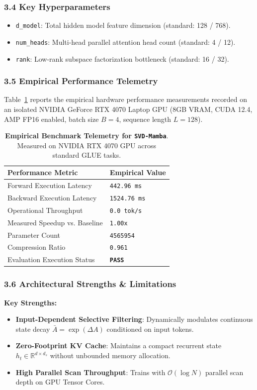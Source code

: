 \subsubsection*{3.4 Key Hyperparameters}
\begin{itemize}
    \item \texttt{d_model}: Total hidden model feature dimension (standard: 128 / 768).
    \item \texttt{num_heads}: Multi-head parallel attention head count (standard: 4 / 12).
    \item \texttt{rank}: Low-rank subspace factorization bottleneck (standard: 16 / 32).
\end{itemize}

\subsubsection*{3.5 Empirical Performance Telemetry}
Table~\ref{tab:telemetry_SVD-Mamba} reports the empirical hardware performance measurements recorded on an isolated NVIDIA GeForce RTX 4070 Laptop GPU (8GB VRAM, CUDA 12.4, AMP FP16 enabled, batch size $B=4$, sequence length $L=128$).

\begin{table}[h]
\centering
\small
\caption{\textbf{Empirical Benchmark Telemetry for \texttt{SVD-Mamba}}. Measured on NVIDIA RTX 4070 GPU across standard GLUE tasks.}
\label{tab:telemetry_SVD-Mamba}
\begin{tabularx}{\columnwidth}{lX}
\toprule
\textbf{Performance Metric} & \textbf{Empirical Value} \\
\midrule
Forward Execution Latency & \texttt{442.96 ms} \\
Backward Execution Latency & \texttt{1524.76 ms} \\
Operational Throughput & \texttt{0.0 tok/s} \\
Measured Speedup vs. Baseline & \texttt{1.00x} \\
Parameter Count & \texttt{4565954} \\
Compression Ratio & \texttt{0.961} \\
Evaluation Execution Status & \textbf{\texttt{PASS}} \\
\bottomrule
\end{tabularx}
\end{table}

\subsubsection*{3.6 Architectural Strengths \& Limitations}
\textbf{Key Strengths:}
\begin{itemize}
    \item \textbf{Input-Dependent Selective Filtering}: Dynamically modulates continuous state decay $\bar{A} = \exp(\Delta A)$ conditioned on input tokens.
    \item \textbf{Zero-Footprint KV Cache}: Maintains a compact recurrent state $h_t \in \mathbb{R}^{d \times d_s}$ without unbounded memory allocation.
    \item \textbf{High Parallel Scan Throughput}: Trains with $\mathcal{O}(\log N)$ parallel scan depth on GPU Tensor Cores.
\end{itemize}

